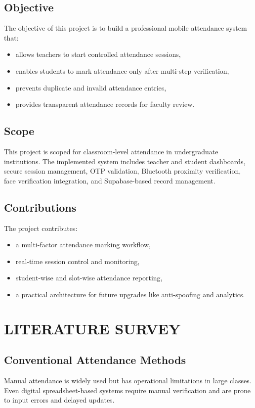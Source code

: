 \documentclass[12pt,a4paper]{report}
\begin{document}
\section{Objective}
The objective of this project is to build a professional mobile attendance system that:
\begin{itemize}[leftmargin=1.5cm]
\item allows teachers to start controlled attendance sessions,
\item enables students to mark attendance only after multi-step verification,
\item prevents duplicate and invalid attendance entries,
\item provides transparent attendance records for faculty review.
\end{itemize}

\section{Scope}
This project is scoped for classroom-level attendance in undergraduate institutions. The implemented system includes teacher and student dashboards, secure session management, OTP validation, Bluetooth proximity verification, face verification integration, and Supabase-based record management.

\section{Contributions}
The project contributes:
\begin{itemize}[leftmargin=1.5cm]
\item a multi-factor attendance marking workflow,
\item real-time session control and monitoring,
\item student-wise and slot-wise attendance reporting,
\item a practical architecture for future upgrades like anti-spoofing and analytics.
\end{itemize}

\chapter{LITERATURE SURVEY}
\section{Conventional Attendance Methods}
Manual attendance is widely used but has operational limitations in large classes. Even digital spreadsheet-based systems require manual verification and are prone to input errors and delayed updates.
\end{document}

